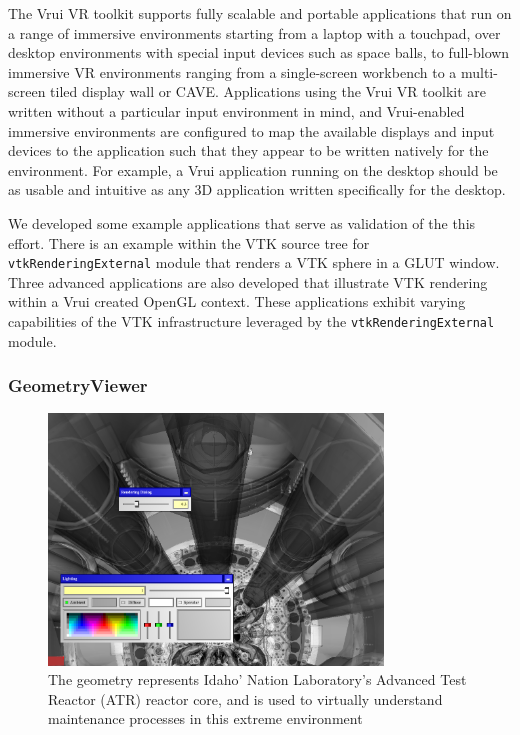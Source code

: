 The Vrui VR toolkit supports fully scalable and portable applications that run on a range of immersive environments starting from a laptop with a touchpad, over desktop environments with special input devices such as space balls, to full-blown immersive VR environments ranging from a single-screen workbench to a multi-screen tiled display wall or CAVE. Applications using the Vrui VR toolkit are written without a particular input environment in mind, and Vrui-enabled immersive environments are configured to map the available displays and input devices to the application such that they appear to be written natively for the environment. For example, a Vrui application running on the desktop should be as usable and intuitive as any 3D application written specifically for the desktop.

We developed some example applications that serve as validation of the this effort. There is an example within the VTK source tree for \texttt{vtkRenderingExternal} module that renders a VTK sphere in a GLUT window. Three advanced applications are also developed that illustrate VTK rendering within a Vrui created OpenGL context. These applications exhibit varying capabilities of the VTK infrastructure leveraged by the \texttt{vtkRenderingExternal} module. 

\subsubsection{GeometryViewer}

\begin{figure}[h!]
 \centering
 \includegraphics[width=3.5in]{images/vessel.png}
 \caption{The geometry represents Idaho' Nation Laboratory's Advanced Test Reactor (ATR) reactor core, and is used to virtually understand maintenance processes in this extreme environment}
 \label{fig:vessel}
\end{figure}

